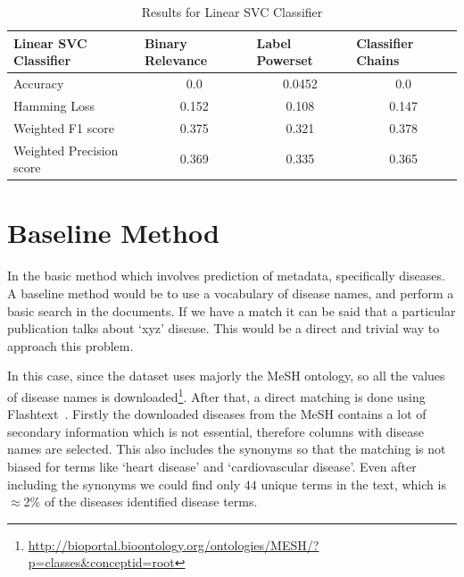 \begin{table}[!htb]
    \centering
    \begin{tabular}{|l|c|c|c|}
\hline
Linear SVC Classifier    & \multicolumn{1}{l|}{Binary Relevance} & \multicolumn{1}{l|}{Label Powerset} & \multicolumn{1}{l|}{Classifier Chains} \\ \hline
Accuracy                 & 0.0                                   & 0.0452                              & 0.0                                    \\ \hline
Hamming Loss             & 0.152                                 & 0.108                               & 0.147                                  \\ \hline
Weighted F1 score        & 0.375                                 & 0.321                               & 0.378                                  \\ \hline
Weighted Precision score & 0.369                                 & 0.335                               & 0.365                                  \\ \hline
\end{tabular}
    \caption{Results for Linear SVC Classifier}
    \label{tab:linearsvc}
\end{table}


\section{Baseline Method}
In the basic method which involves prediction of metadata, specifically diseases. A baseline method would be to use a vocabulary of disease names, and perform a basic search in the documents. If we have a match it can be said that a particular publication talks about `xyz' disease. This would be a direct and trivial way to approach this problem. 

In this case, since the dataset uses majorly  the MeSH ontology, so all the values of disease names is downloaded\footnote{\url{http://bioportal.bioontology.org/ontologies/MESH/?p=classes&conceptid=root}}. After that, a direct matching is done using Flashtext~\cite{2017arXiv171100046S}. Firstly the downloaded diseases from the MeSH contains a lot of secondary information which is not essential, therefore columns with disease names are selected. This also includes the synonyms so that the matching is not biased for terms like `heart disease' and `cardiovascular disease'. Even after including the synonyms we could find only $44$ unique terms in the text, which is $\approx$2\% of the diseases identified disease terms. 

